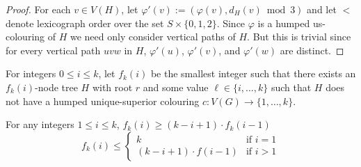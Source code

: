 \documentclass[kpfonts]{patmorin}
\begin{document}
\begin{proof}
   For each $v\in V(H)$, let $\varphi'(v):=(\varphi(v), d_H(v)\bmod 3)$ and let $<$ denote lexicograph order over the set $S\times\{0,1,2\}$.  Since $\varphi$ is a humped us-colouring of $H$ we need only consider vertical paths of $H$.  But this is trivial since for every vertical path $uvw$ in $H$, $\varphi'(u)$, $\varphi'(v)$, and $\varphi'(w)$ are distinct.
\end{proof}

For integers $0\le i\le k$, let $f_k(i)$ be the smallest integer such that there exists an $f_k(i)$-node tree $H$ with root $r$ and some value $\ell \in\{i,\ldots,k\}$ such that $H$ does not have a humped unique-superior colouring $c:V(G)\to \{1,\ldots,k\}$.

\begin{lem}\label{recursion}
    For any integers $1\le  i\le k$, $f_k(i) \ge (k-i+1)\cdot f_k(i-1)$
    \[
        f_k(i) \le \begin{cases}
                    k & \text{if $i=1$} \\
                    (k-i+1)\cdot f(i-1) & \text{if $i>1$}
                 \end{cases}
    \]
\end{lem}
\end{document}
